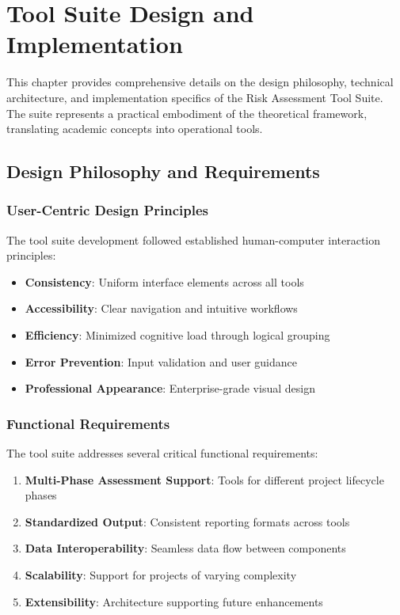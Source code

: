 \documentclass[binding=0.6cm]{sapthesis}
\begin{document}
\chapter{Tool Suite Design and Implementation}
\label{ch:implementation}

This chapter provides comprehensive details on the design philosophy, technical architecture, and implementation specifics of the Risk Assessment Tool Suite. The suite represents a practical embodiment of the theoretical framework, translating academic concepts into operational tools.

\section{Design Philosophy and Requirements}

\subsection{User-Centric Design Principles}

The tool suite development followed established human-computer interaction principles:

\begin{itemize}
    \item \textbf{Consistency}: Uniform interface elements across all tools
    \item \textbf{Accessibility}: Clear navigation and intuitive workflows
    \item \textbf{Efficiency}: Minimized cognitive load through logical grouping
    \item \textbf{Error Prevention}: Input validation and user guidance
    \item \textbf{Professional Appearance}: Enterprise-grade visual design
\end{itemize}

\subsection{Functional Requirements}

The tool suite addresses several critical functional requirements:

\begin{enumerate}
    \item \textbf{Multi-Phase Assessment Support}: Tools for different project lifecycle phases
    \item \textbf{Standardized Output}: Consistent reporting formats across tools
    \item \textbf{Data Interoperability}: Seamless data flow between components
    \item \textbf{Scalability}: Support for projects of varying complexity
    \item \textbf{Extensibility}: Architecture supporting future enhancements
\end{enumerate}
\end{document}
